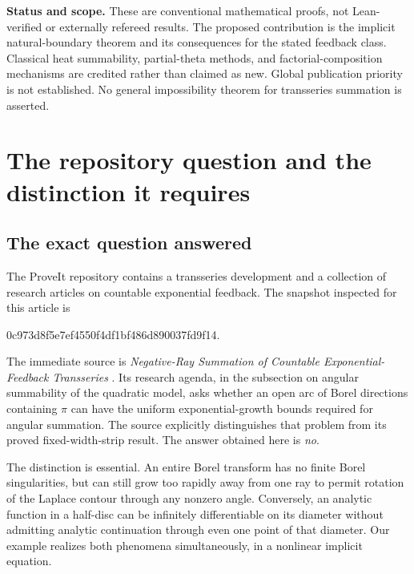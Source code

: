\documentclass[11pt,a4paper]{article}
\numberwithin{equation}{section}
\theoremstyle{definition}
\theoremstyle{remark}
\begin{document}
\noindent\textbf{Status and scope.}
These are conventional mathematical proofs, not Lean-verified or externally
refereed results.  The proposed contribution is the implicit natural-boundary
theorem and its consequences for the stated feedback class.  Classical heat
summability, partial-theta methods, and factorial-composition mechanisms are
credited rather than claimed as new.  Global publication priority is not
established.  No general impossibility theorem for transseries summation is
asserted.

\clearpage
\setcounter{tocdepth}{1}
\tableofcontents
\clearpage

\section{The repository question and the distinction it requires}
\label{sec:context}

\subsection{The exact question answered}
The ProveIt repository contains a transseries development and a collection
of research articles on countable exponential feedback.  The snapshot
inspected for this article is
\begin{center}\small\ttfamily
0c973d8f5e7ef4550f4df1bf486d890037fd9f14.
\end{center}
The immediate source is \emph{Negative-Ray Summation of Countable
Exponential-Feedback Transseries} \cite{repo-negative}.  Its research agenda,
in the subsection on angular summability of the quadratic model, asks
whether an open arc of Borel directions containing $\pi$ can have the
uniform exponential-growth bounds required for angular summation.
The source explicitly distinguishes that problem from its proved
fixed-width-strip result.  The answer obtained here is \emph{no}.

The distinction is essential.  An entire Borel transform has no finite
Borel singularities, but can still grow too rapidly away from one ray to
permit rotation of the Laplace contour through any nonzero angle.
Conversely, an analytic function in a half-disc can be infinitely
differentiable on its diameter without admitting analytic continuation
through even one point of that diameter.  Our example realizes both
phenomena simultaneously, in a nonlinear implicit equation.
\end{document}
